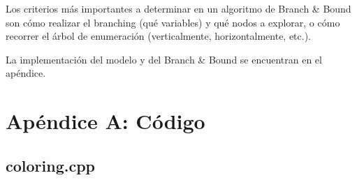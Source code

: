 \documentclass[10pt,a4paper]{article}
\begin{document}
Los criterios más importantes a determinar en un algoritmo de Branch \& Bound son cómo realizar el branching (qué variables) y qué nodos a explorar, o cómo recorrer el árbol de enumeración (verticalmente, horizontalmente, etc.).

La implementación del modelo y del Branch \& Bound se encuentran en el apéndice.

\newpage

\newpage


\vfill



\pagebreak

\section{Apéndice A: Código}
\subsection{coloring.cpp}

\end{document}
